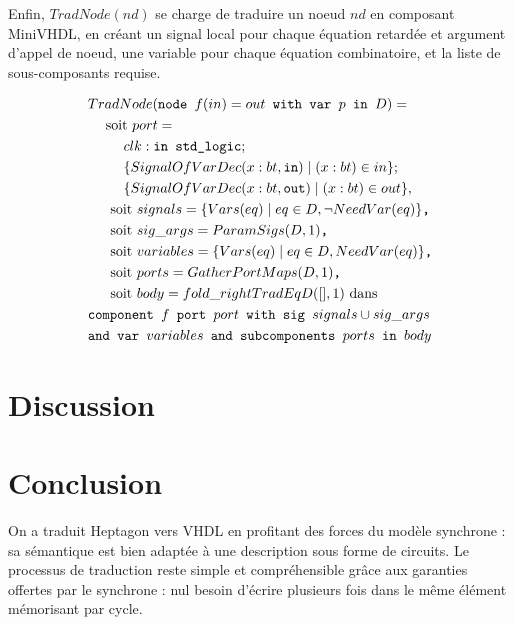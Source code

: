 \documentclass[a4paper]{article}
\newcommand{\LANG}{Heptagon}
\newcommand{\p}[0]{\; \vert \;}
\newcommand{\mybox}[1]{\mbox{\tt{#1}}}
\newcommand{\bl}[0]{\hspace{0.45cm}}
\begin{document}
Enfin, $TradNode(nd)$ se charge de traduire un noeud $nd$ en composant MiniVHDL, en
cr\'eant un signal local pour chaque \'equation retard\'ee et argument d'appel de
noeud, une variable pour chaque \'equation combinatoire, et la liste de
sous-composants requise.

\begin{align*}
  & TradNode(\mybox{node } f(in) = out \mybox{ with var } p \mybox{ in } D) = \\
  & \bl \mbox{soit } port = \\
  & \bl \bl clk : \mybox{in std\_logic}; \\
  & \bl \bl \{ SignalOfVarDec(x : bt, \mybox{in}) \p (x : bt) \in in \}; \\
  & \bl \bl \{ SignalOfVarDec(x : bt, \mybox{out}) \p (x : bt) \in out \}, \\
  & \bl \mbox{ soit } signals = \{ \V{eq} \p eq \in D, \neg \NV{eq} \}
  \mybox{,} \\
  & \bl \mbox{ soit } sig\_args = \PS{D}{1} \mybox{,} \\
  & \bl \mbox{ soit } variables = \{ \V{eq} \p eq \in D, \NV{eq} \} \mybox{,} \\
  & \bl \mbox{ soit } ports = \GPM{D}{1} \mybox{,} \\
  & \bl \mbox{ soit } body = fold\_right TradEq D ([], 1) \mbox{ dans} \\
  & \mybox{component } f \mybox{ port } port \mybox{ with sig } signals \cup
  sig\_args \\
  & \mybox{and var } variables \mybox{ and subcomponents } ports \mybox{ in }
  body
\end{align*}

\section{Discussion}

\section{Conclusion}

On a traduit \LANG{} vers VHDL en profitant des forces du mod\`ele synchrone : sa
s\'emantique est bien adapt\'ee \`a une description sous forme de circuits. Le
processus de traduction reste simple et compr\'ehensible gr\^ace aux garanties
offertes par le synchrone : nul besoin d'\'ecrire plusieurs fois dans le m\^eme
\'el\'ement m\'emorisant par cycle.

\newpage
\end{document}

